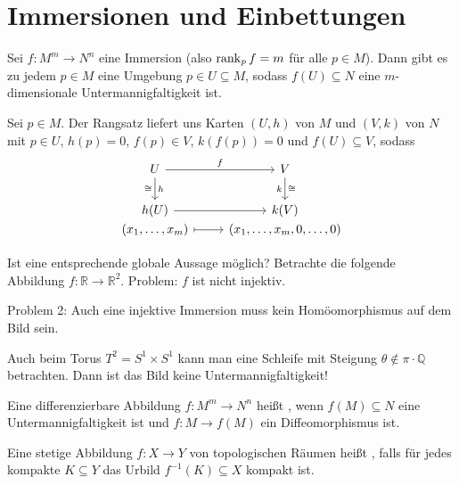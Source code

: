 \section*{Immersionen und Einbettungen}

\begin{satz}[label=satz:immersion_bild]
	Sei $f \colon M^m \to N^n$ eine Immersion (also $\operatorname{rank}_p f =m$ für alle $p \in M$).
	Dann gibt es zu jedem $p \in M$ eine Umgebung $p \in U \subseteq M$, sodass $f(U) \subseteq N$ eine $m$-dimensionale Untermannigfaltigkeit ist.
\end{satz}
\begin{beweis}
	Sei $p \in M$.
	Der Rangsatz liefert uns Karten $(U,h)$ von $M$ und $(V,k)$ von $N$ mit $p \in U$, $h(p)=0$, $f(p) \in V$, $k(f(p))=0$ und $f(U) \subseteq V$, sodass
	\[
		\begin{tikzcd}
			U \rar["f"] \dar["h","\cong"'] & V \dar["\cong","k"'] \\
			h(U) \rar & k(V) \\[-2em]
			(x_1, \ldots ,x_m) \rar[mapsto] & (x_1, \ldots ,x_m, 0, \ldots ,0)
		\end{tikzcd}
	\]
\end{beweis}

Ist eine entsprechende globale Aussage möglich? Betrachte die folgende Abbildung $f \colon \mathbb{R} \to \mathbb{R}^2$.
Problem: $f$ ist nicht injektiv.

Problem 2: Auch eine injektive Immersion muss kein Homöomorphismus auf dem Bild sein.

Auch beim Torus $T^2= S^1 \times S^1$ kann man eine Schleife mit Steigung $\theta \notin \pi \cdot \mathbb{Q}$ betrachten.
Dann ist das Bild keine Untermannigfaltigkeit!

\begin{definition}[{name=[Einbettung]}]
	Eine differenzierbare Abbildung $f \colon M^m \to N^n$ heißt , wenn $f(M) \subseteq N$ eine Untermannigfaltigkeit ist und $f \colon M \to f(M)$ ein Diffeomorphismus ist.
\end{definition}

\begin{definition}[{name=[eigentliche Abbildung]}]
	Eine stetige Abbildung $f\colon X \to Y$ von topologischen Räumen heißt , falls für jedes kompakte $K \subseteq Y$ das Urbild $f^{-1}(K) \subseteq X$ kompakt ist.
\end{definition}

